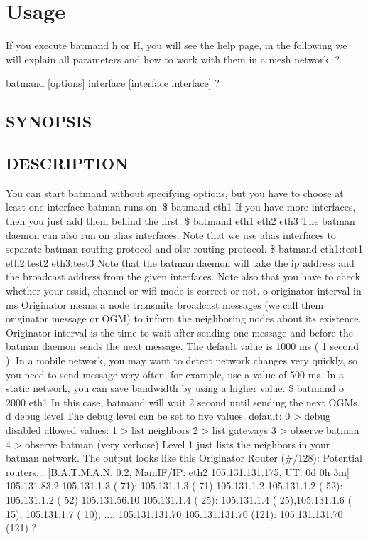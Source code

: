\documentclass[
	12pt,
	a4paper,
	twoside,
	english,
	headsepline,
	footnosepline,
	automark,
	normalheadings,
	openany,
	cleardoubleplain,
	abstracton,
	idxtotoc,
	liststotoc,
	bibtotoc,
 	BCOR8mm,
]{scrartcl}
\begin{document}
\section{Usage}
If you execute batmand  h or  H, you will see the help page, in the following we will explain  all parameters and how to work with them in a mesh network.
?

batmand [options] interface [interface interface]
?

\subsection{SYNOPSIS}

\subsection{DESCRIPTION}
You can start batmand without specifying options, but you have to choose at least one  interface batman runs on. \$ batmand eth1 If you have more interfaces, then you just add them behind the first. \$ batmand eth1 eth2 eth3 The batman daemon can also run on alias interfaces. Note that we use alias interfaces to separate batman routing protocol and olsr routing  protocol. \$ batmand eth1:test1 eth2:test2 eth3:test3 Note that the batman daemon will take the ip address and the broadcast address from the  given interfaces. Note also that you have to check whether your essid, channel or wifi mode is correct or not.
 o originator interval in ms Originator means a node transmits broadcast messages (we call them originator message or  OGM) to inform the neighboring nodes about its existence. Originator interval is the time to wait after sending one message and before the batman  daemon sends the next message. The default value is 1000 ms ( 1 second ). In a mobile network, you may want to detect network changes very quickly, so you need to  send message very often, for example, use a value of 500 ms. In a static network, you can save bandwidth by using a higher value. \$ batmand  o 2000 eth1 In this case, batmand will wait 2 second until sending the next OGMs.  d debug level The debug level can be set to five values.           default:   0  > debug disabled           allowed values:   1  > list neighbors                               2  > list gateways                               3  > observe batman                               4  > observe batman (very verbose) Level 1 just lists the neighbors in your batman network. The output looks like this Originator           Router (\#/128):    Potential routers... [B.A.T.M.A.N. 0.2, MainIF/IP:   eth2 105.131.131.175, UT: 0d 0h 3m] 105.131.83.2        105.131.1.3 (  71):     105.131.1.3 (  71) 105.131.1.2         105.131.1.2 (  52):     105.131.1.2 (  52) 105.131.56.10     105.131.1.4 (  25):   105.131.1.4 (  25),105.131.1.6 ( 15), 105.131.1.7 ( 10),   .... 105.131.131.70   105.131.131.70 (121):  105.131.131.70 (121)
?
\end{document}
